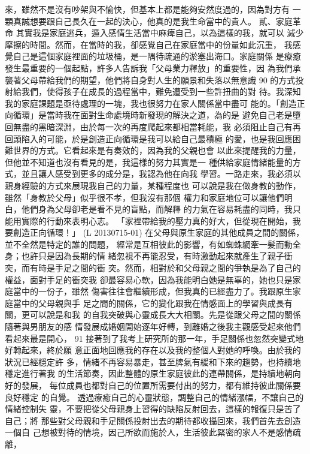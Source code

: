 來，雖然不是沒有吵架與不愉快，但基本上都是能夠安然度過的，因為對方有
一顆真誠想要跟自己長久在一起的決心，他真的是我生命當中的貴人。 
貳、家庭革命 
其實我是家庭逃兵，遁入感情生活當中麻痺自己，以為這樣的我，就可以
減少摩擦的時間。然而，在當時的我，卻感覺自己在家庭當中的份量如此沉重，
我感覺自己是這個家庭裡面的垃圾桶，是一隅待疏通的淤塞出海口。家庭關係
是療癒發生最重要的一個起點，許多人告訴我「父母業力釋放」的重要性，因
為我們承襲著父母帶給我們的期望，他們將自身對人生的願景和失落以無意識
90 
的方式投射給我們，使得孩子在成長的過程當中，難免遭受到一些許扭曲的對
待。我深知我的家庭課題是亟待處理的一塊，我也很努力在家人關係當中盡可
能的。「創造正向循環」是當時我在面對生命處境時新發現的解決之道，為的是
避免自己老是墮回無盡的黑暗深淵，由於每一次的再度爬起來都相當耗能，我
必須阻止自己有再回頭陷入的可能，於是創造正向循環是我可以給自己最積極
的愛，也是我回應困難世界的方式。它看起來是有奏效的，因為我的父親也會
以此來提醒我的力量，但他並不知道也沒有看見的是，我這樣的努力其實是一
種供給家庭情緒能量的方式，並且讓人感受到更多的成分是，我認為他在向我
學習。一路走來，我必須以親身經驗的方式來展現我自己的力量，某種程度也
可以說是我在做身教的動作，雖然「身教於父母」似乎很不孝，但我沒有那個
權力和家庭地位可以讓他們明白，他們身為父母卻老是看不見的盲點，而解釋
的力氣在容易耗盡的同時，我只能用實際的行動來表明心志。 
「家裡帶給我的壓力真的好大，但從現在開始，我要創造正向循環！」 (L
20130715-01)  
在父母與原生家庭的其他成員之間的關係，並不全然是特定的誰的問題，
經常是互相彼此的影響，有如蜘蛛網牽一髮而動全身；也許只是因為長期的情
緒忽視不再能忍受，有時激動起來就產生了親子衝突，而有時是手足之間的衝
突。然而，相對於和父母親之間的爭執是為了自己的權益，面對手足的衝突我
卻最容易心軟，因為我能明白她是無辜的，她也只是家庭當中的一份子，雖然
傷害往往會繼續形成，但我真的已經盡力了。我跟原生家庭當中的父母親與手
足之間的關係，它的變化跟我在情感面上的學習與成長有關，更可以說是和我
的自我突破與心靈成長大大相關。先是從跟父母之間的關係隨著與男朋友的感
情發展成婚姻開始逐年好轉，到離婚之後我主觀感受起來他們看起來最是開心，
91 
接著到了我考上研究所的那一年，手足關係也忽然突變式地好轉起來，終於願
意正面地回應我的存在以及我的整個人對她的呼喚。由於我的狀況已經穩定許
多，情緒不再容易暴走，甚至脾氣有緩和下來的趨勢，也持續地穩定進行著我
的生活節奏，因此整體的原生家庭彼此的連帶關係，是持續地朝向好的發展，
每位成員也都對自己的位置所需要付出的努力，都有維持彼此關係要良好穩定
的自覺。 
透過療癒自己的心靈狀態，調整自己的情緒漲幅，不讓自己的情緒控制失
靈，不要把從父母親身上習得的缺陷反射回去，這樣的報復只是苦了自己；將
那些對父母親和手足關係投射出去的期待都收攝回來，我們首先去創造一個自
己想被對待的情境，因己所欲而施於人，生活彼此緊密的家人不是感情疏離，
